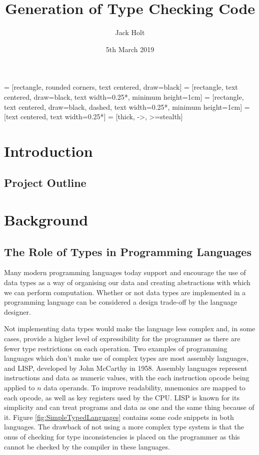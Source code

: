 \documentclass{UoYCSproject}
\title{Generation of Type Checking Code}
\author{Jack Holt}
\date{5th March 2019}
\begin{document}
 = [rectangle, rounded corners, text centered, draw=black]
 = [rectangle, text centered, draw=black, 
text width=0.25*\columnwidth, minimum height=1cm]
 = [rectangle, text centered, draw=black, dashed,
text width=0.25*\columnwidth, minimum height=1cm]
 = [text centered, text width=0.25*\columnwidth]
 = [thick, ->, >=stealth]

\maketitle
\listoffigures
{}

\begin{summary}
\end{summary}

\chapter{Introduction}

\section{Project Outline}

\chapter{Background}

\section{The Role of Types in Programming Languages}
Many modern programming languages today support and encourage the use of data
types as a way of organising our data and creating abstractions with which
we can perform computation. Whether or not data types are implemented in a
programming language can be considered a design trade-off by the language
designer.

Not implementing data types would make the language less complex and,
in some cases, provide a higher level of expressibility for the programmer as
there are fewer type restrictions on each operation. Two examples of programming 
languages which don't make use of complex types are most assembly languages, 
and LISP, developed by John McCarthy in 1958. Assembly languages represent
instructions and data as numeric values, with the each instruction opcode being
applied to $n$ data operands. To improve readability, mnemonics are mapped to
each opcode, as well as key registers used by the CPU. LISP is 
known for its simplicity and can treat programs and data as one and the same 
thing because of it. Figure \ref{fig:SimpleTypedLanguages} contains some code 
snippets in both languages. The drawback of not using a more complex type system
is that the onus of checking for type inconsistencies is placed on the programmer
as this cannot be checked by the compiler in these languages.
\end{document}

